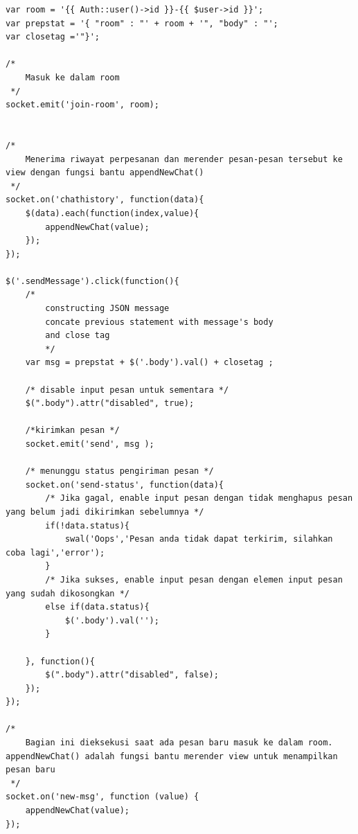 \begin{lstlisting}[label=cdjq.04-04,style=htmlcssjs,caption=Kode Sumber Logika Pengiriman \& Penerimaan Pesan (menggunakan jQuery)]
var room = '{{ Auth::user()->id }}-{{ $user->id }}';
var prepstat = '{ "room" : "' + room + '", "body" : "';
var closetag ='"}';

/* 
	Masuk ke dalam room
 */
socket.emit('join-room', room);


/* 
	Menerima riwayat perpesanan dan merender pesan-pesan tersebut ke view dengan fungsi bantu appendNewChat()
 */
socket.on('chathistory', function(data){
    $(data).each(function(index,value){
        appendNewChat(value);
    });
});

$('.sendMessage').click(function(){
	/*	
		constructing JSON message 
		concate previous statement with message's body
		and close tag
		*/
    var msg = prepstat + $('.body').val() + closetag ;

    /* disable input pesan untuk sementara */
    $(".body").attr("disabled", true);

    /*kirimkan pesan */
    socket.emit('send', msg );

    /* menunggu status pengiriman pesan */
    socket.on('send-status', function(data){
    	/* Jika gagal, enable input pesan dengan tidak menghapus pesan yang belum jadi dikirimkan sebelumnya */
        if(!data.status){
            swal('Oops','Pesan anda tidak dapat terkirim, silahkan coba lagi','error');
        }
        /* Jika sukses, enable input pesan dengan elemen input pesan yang sudah dikosongkan */
        else if(data.status){
            $('.body').val('');
        }

    }, function(){
        $(".body").attr("disabled", false);
    });
});

/* 
	Bagian ini dieksekusi saat ada pesan baru masuk ke dalam room. appendNewChat() adalah fungsi bantu merender view untuk menampilkan pesan baru
 */
socket.on('new-msg', function (value) {
    appendNewChat(value);
});
\end{lstlisting}